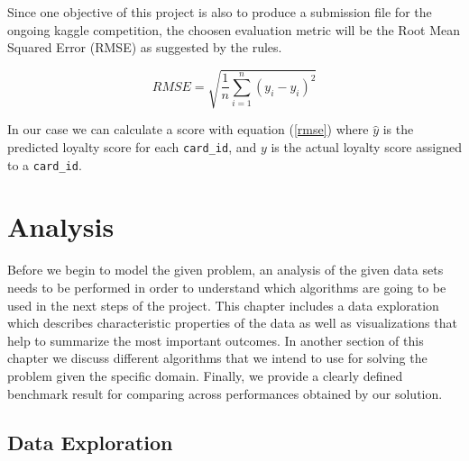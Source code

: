 \documentclass{article}
\begin{document}


Since one objective of this project is also to produce a submission file for the ongoing kaggle competition, the choosen evaluation metric will be the Root Mean Squared Error (RMSE) as suggested by the rules.

\begin{equation} \label{rmse}
    RMSE = \sqrt{\frac{1}{n}\sum_{i=1}^{n}(y_i-\hat{y_i})^2}
\end{equation}

In our case we can calculate a score with equation (\ref{rmse}) where $\hat{y}$ is the predicted loyalty score for each \texttt{card\_id}, and $y$ is the actual loyalty score assigned to a \texttt{card\_id}.

\newpage
\section{Analysis}
Before we begin to model the given problem, an analysis of the given data sets needs to be performed in order to understand which algorithms are going to be used in the next steps of the project. This chapter includes a data exploration which describes characteristic properties of the data as well as visualizations that help to summarize the most important outcomes. In another section of this chapter we discuss different algorithms  that we intend to use for solving the problem given the specific domain. Finally, we  provide a clearly defined benchmark result for comparing across performances obtained by our solution.

\subsection{Data Exploration}
\end{document}
